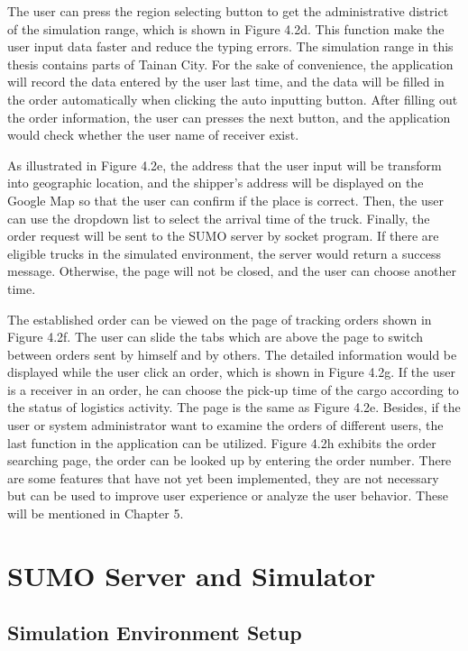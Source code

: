 \documentclass[12pt]{ksthesis}
\begin{document}
\begin{thesis}
{The user can press the region selecting button to get the administrative district of the simulation range, which is shown in Figure 4.2d. This function make the user input data faster and reduce the typing errors. The simulation range in this thesis contains parts of Tainan City. For the sake of convenience, the application will record the data entered by the user last time, and the data will be filled in the order automatically when clicking the auto inputting button. After filling out the order information, the user can presses the next button, and the application would check whether the user name of receiver exist. 

As illustrated in Figure 4.2e, the address that the user input will be transform into geographic location, and the shipper’s address will be displayed on the Google Map so that the user can confirm if the place is correct. Then, the user can use the dropdown list to select the arrival time of the truck. Finally, the order request will be sent to the SUMO server by socket program. If there are eligible trucks in the simulated environment, the server would return a success message. Otherwise, the page will not be closed, and the user can choose another time.  

The established order can be viewed on the page of tracking orders shown in Figure 4.2f. The user can slide the tabs which are above the page to switch between orders sent by himself and by others. The detailed information would be displayed while the user click an order, which is shown in Figure 4.2g. If the user is a receiver in an order, he can choose the pick-up time of the cargo according to the status of logistics activity. The page is the same as Figure 4.2e. Besides, if the user or system administrator want to examine the orders of different users, the last function in the application can be utilized. Figure 4.2h exhibits the order searching page, the order can be looked up by entering the order number. There are some features that have not yet been implemented, they are not necessary but can be used to improve user experience or analyze the user behavior. These will be mentioned in Chapter 5.



\section{SUMO Server and Simulator}

\subsection{Simulation Environment Setup}

}
\end{thesis}
\end{document}
